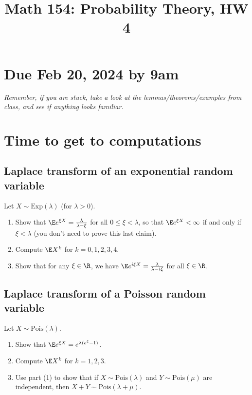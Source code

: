 \documentclass[12pt,reqno]{amsart}
\title{\Large Math 154: Probability Theory, HW 4\vspace{-0.1cm}}
\theoremstyle{definition}
\theoremstyle{remark}
\numberwithin{equation}{section}
\newenvironment{nouppercase}{%
  \let\uppercase\relax%
  \renewcommand{\uppercasenonmath}[1]{}}{}
\begin{document}
\begin{nouppercase}
\maketitle
\end{nouppercase}
\section*{Due Feb 20, 2024 by 9am}
\emph{Remember, if you are stuck, take a look at the lemmas/theorems/examples from class, and see if anything looks familiar.}
\section{Time to get to computations}
\subsection{Laplace transform of an exponential random variable}
Let $X\sim\mathrm{Exp}(\lambda)$ (for $\lambda>0$). 
\begin{enumerate}
\item Show that $\E e^{\xi X}=\frac{\lambda}{\lambda-\xi}$ for all $0\leq\xi<\lambda$, so that $\E e^{\xi X}<\infty$ if and only if $\xi<\lambda$ (you don't need to prove this last claim).
\item Compute $\E X^{k}$ for $k=0,1,2,3,4$.
\item Show that for any $\xi\in\R$, we have $\E e^{i\xi X}=\frac{\lambda}{\lambda-i\xi}$ for all $\xi\in\R$.
\end{enumerate}
\subsection{Laplace transform of a Poisson random variable}
Let $X\sim \mathrm{Pois}(\lambda)$.
\begin{enumerate}
\item Show that $\E e^{\xi X}=e^{\lambda(e^{\xi}-1)}$.
\item Compute $\E X^{k}$ for $k=1,2,3$.
\item Use part (1) to show that if $X\sim\mathrm{Pois}(\lambda)$ and $Y\sim\mathrm{Pois}(\mu)$ are independent, then $X+Y\sim\mathrm{Pois}(\lambda+\mu)$.
\end{enumerate}
\end{document}
